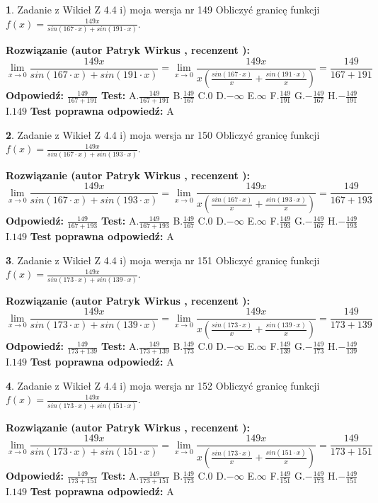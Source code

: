 \documentclass[12pt, a4paper]{article}
\theoremstyle{definition} %
\newtheorem{zad}{}
\newcommand{\zadStart}[1]{\begin{zad}#1\newline}
\newcommand{\zadStop}{\end{zad}}
\newcommand{\rozwStart}[2]{\noindent \textbf{Rozwiązanie (autor #1 , recenzent #2): }\newline}
\newcommand{\rozwStop}{\newline}
\newcommand{\odpStart}{\noindent \textbf{Odpowiedź:}\newline}
\newcommand{\odpStop}{\newline}
\newcommand{\testStart}{\noindent \textbf{Test:}\newline}
\newcommand{\testStop}{\newline}
\newcommand{\kluczStart}{\noindent \textbf{Test poprawna odpowiedź:}\newline}
\newcommand{\kluczStop}{\newline}
\begin{document}
\zadStart{Zadanie z Wikieł Z 4.4 i) moja wersja nr 149}
Obliczyć granicę funkcji $f(x)=\frac{149x}{sin(167\cdot x) +sin(191\cdot x)}$.
\zadStop
\rozwStart{Patryk Wirkus}{}
$$\lim\limits_{x\to 0}\frac{149x}{sin(167\cdot x) +sin(191\cdot x)}=\lim\limits_{x\to 0}\frac{149x}{x(\frac{sin(167\cdot x)}{x}+\frac{sin(191\cdot x)}{x})}=\frac{149}{167+191}$$
\rozwStop
\odpStart
$\frac{149}{167+191}$
\odpStop
\testStart
A.$\frac{149}{167+191}$
B.$\frac{149}{167}$
C.$0$
D.$-\infty$
E.$\infty$
F.$\frac{149}{191}$
G.$-\frac{149}{167}$
H.$-\frac{149}{191}$
I.$149$
\testStop
\kluczStart
A
\kluczStop



\zadStart{Zadanie z Wikieł Z 4.4 i) moja wersja nr 150}
Obliczyć granicę funkcji $f(x)=\frac{149x}{sin(167\cdot x) +sin(193\cdot x)}$.
\zadStop
\rozwStart{Patryk Wirkus}{}
$$\lim\limits_{x\to 0}\frac{149x}{sin(167\cdot x) +sin(193\cdot x)}=\lim\limits_{x\to 0}\frac{149x}{x(\frac{sin(167\cdot x)}{x}+\frac{sin(193\cdot x)}{x})}=\frac{149}{167+193}$$
\rozwStop
\odpStart
$\frac{149}{167+193}$
\odpStop
\testStart
A.$\frac{149}{167+193}$
B.$\frac{149}{167}$
C.$0$
D.$-\infty$
E.$\infty$
F.$\frac{149}{193}$
G.$-\frac{149}{167}$
H.$-\frac{149}{193}$
I.$149$
\testStop
\kluczStart
A
\kluczStop



\zadStart{Zadanie z Wikieł Z 4.4 i) moja wersja nr 151}
Obliczyć granicę funkcji $f(x)=\frac{149x}{sin(173\cdot x) +sin(139\cdot x)}$.
\zadStop
\rozwStart{Patryk Wirkus}{}
$$\lim\limits_{x\to 0}\frac{149x}{sin(173\cdot x) +sin(139\cdot x)}=\lim\limits_{x\to 0}\frac{149x}{x(\frac{sin(173\cdot x)}{x}+\frac{sin(139\cdot x)}{x})}=\frac{149}{173+139}$$
\rozwStop
\odpStart
$\frac{149}{173+139}$
\odpStop
\testStart
A.$\frac{149}{173+139}$
B.$\frac{149}{173}$
C.$0$
D.$-\infty$
E.$\infty$
F.$\frac{149}{139}$
G.$-\frac{149}{173}$
H.$-\frac{149}{139}$
I.$149$
\testStop
\kluczStart
A
\kluczStop



\zadStart{Zadanie z Wikieł Z 4.4 i) moja wersja nr 152}
Obliczyć granicę funkcji $f(x)=\frac{149x}{sin(173\cdot x) +sin(151\cdot x)}$.
\zadStop
\rozwStart{Patryk Wirkus}{}
$$\lim\limits_{x\to 0}\frac{149x}{sin(173\cdot x) +sin(151\cdot x)}=\lim\limits_{x\to 0}\frac{149x}{x(\frac{sin(173\cdot x)}{x}+\frac{sin(151\cdot x)}{x})}=\frac{149}{173+151}$$
\rozwStop
\odpStart
$\frac{149}{173+151}$
\odpStop
\testStart
A.$\frac{149}{173+151}$
B.$\frac{149}{173}$
C.$0$
D.$-\infty$
E.$\infty$
F.$\frac{149}{151}$
G.$-\frac{149}{173}$
H.$-\frac{149}{151}$
I.$149$
\testStop
\kluczStart
A
\kluczStop
\end{document}
